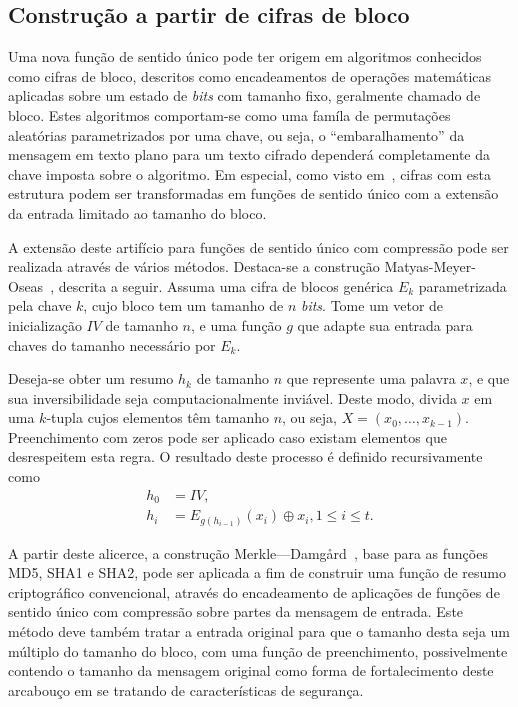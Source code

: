 \documentclass{ufsctex/ufsctex}
\begin{document}
\subsection{Construção a partir de cifras de bloco}\label{subsection:const}

Uma nova função de sentido único pode ter origem em algoritmos conhecidos como
cifras de bloco, descritos como encadeamentos de operações matemáticas
aplicadas sobre um estado de \emph{bits} com tamanho fixo, geralmente chamado
de bloco. Estes algoritmos comportam-se como uma famíla de permutações
aleatórias parametrizados por uma chave, ou seja, o ``embaralhamento'' da
mensagem em texto plano para um texto cifrado dependerá completamente da chave
imposta sobre o algoritmo. Em especial, como visto em~\cite[Exemplo
9.13]{Menezes:book:1996}, cifras com esta estrutura podem ser transformadas em
funções de sentido único com a extensão da entrada limitado ao tamanho do
bloco.

A extensão deste artifício para funções de sentido único com compressão pode
ser realizada através de vários métodos. Destaca-se a construção
Matyas-Meyer-Oseas~\cite[Algoritmo 9.41]{Menezes:book:1996}, descrita a seguir.
Assuma uma cifra de blocos genérica $E_{k}$ parametrizada pela chave $k$, cujo
bloco tem um tamanho de $n$ \emph{bits}. Tome um vetor de inicialização $IV$ de
tamanho $n$, e uma função $g$ que adapte sua entrada para chaves do tamanho
necessário por $E_{k}$.

Deseja-se obter um resumo $h_{k}$ de tamanho $n$ que represente uma palavra
$x$, e que sua inversibilidade seja computacionalmente inviável. Deste modo,
divida $x$ em uma $k$-tupla cujos elementos têm tamanho $n$, ou seja, $X =
(x_{0}, \dots, x_{k - 1})$. Preenchimento com zeros pode ser aplicado caso
existam elementos que desrespeitem esta regra. O resultado deste processo é
definido recursivamente como
\begin{equation}
  \begin{split}
    h_{0} &= IV, \\
    h_{i} &= E_{g(h_{i - 1})}(x_{i}) \oplus x_{i}, 1 \leq i \leq t.
  \end{split}
\end{equation}

A partir deste alicerce, a construção
Merkle---Damgård~\cite{Merkle:phd:1979:jun}, base para as funções MD5,
SHA1 e SHA2, pode ser aplicada a fim
de construir uma função de resumo criptográfico convencional, através do
encadeamento de aplicações de funções de sentido único com compressão sobre
partes da mensagem de entrada. Este método deve também tratar a entrada
original para que o tamanho desta seja um múltiplo do tamanho do bloco, com uma
função de preenchimento, possivelmente contendo o tamanho da mensagem original
como forma de fortalecimento deste arcabouço em se tratando de características
de segurança.
\end{document}
